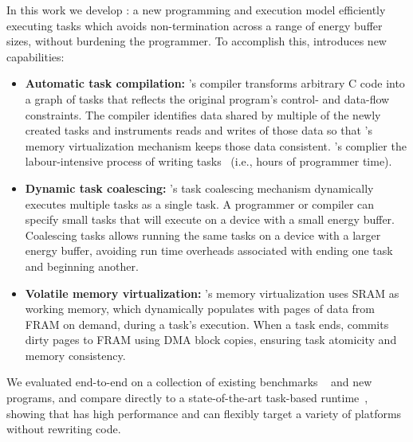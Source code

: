 In this work we develop {\bf \sys}: a new programming and execution model efficiently executing tasks which avoids non-termination across a range of energy buffer sizes, without burdening the programmer. To accomplish this, \sys introduces new capabilities: 

\begin{itemize}
	\item {\bf Automatic task compilation:} \sys's compiler transforms arbitrary C code into a graph of tasks that reflects the original program's control- and data-flow constraints. The compiler identifies data shared by multiple of the newly created tasks and instruments reads and writes of those data so that \sys's memory virtualization mechanism keeps those data consistent. \sys's complier the labour-intensive process of writing tasks~\cite{chain,alpaca} (i.e., hours of programmer time).
	\item {\bf Dynamic task coalescing:} \sys's task coalescing mechanism dynamically executes multiple tasks as a single task. A programmer or compiler can specify small tasks that will execute on a device with a small energy buffer. Coalescing tasks allows running the same tasks on a device with a larger energy buffer, avoiding run time overheads associated with ending one task and beginning another.
	\item {\bf Volatile memory virtualization:} \sys's memory virtualization uses SRAM as working memory, which \sys dynamically populates with pages of data from FRAM on demand, during a task's execution. When a task ends, \sys commits dirty pages to FRAM using DMA block copies, ensuring task atomicity and memory consistency.
\end{itemize}

We evaluated \sys end-to-end on a collection of existing benchmarks ~\cite{chain} and new programs, and compare directly to a state-of-the-art task-based runtime~\cite{chain}, showing that \sys has high performance and can flexibly target a variety of platforms without rewriting code. %


